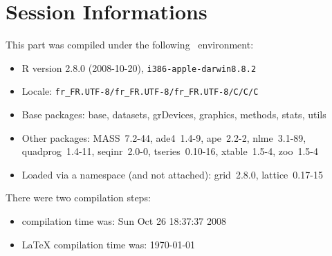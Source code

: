 \documentclass{article}
\begin{document}
\section*{Session Informations}

This part was compiled under the following \Rlogo{}~environment:

\begin{itemize}
  \item R version 2.8.0 (2008-10-20), \verb|i386-apple-darwin8.8.2|
  \item Locale: \verb|fr_FR.UTF-8/fr_FR.UTF-8/fr_FR.UTF-8/C/C/C|
  \item Base packages: base, datasets, grDevices, graphics, methods,
    stats, utils
  \item Other packages: MASS~7.2-44, ade4~1.4-9, ape~2.2-2,
    nlme~3.1-89, quadprog~1.4-11, seqinr~2.0-0, tseries~0.10-16,
    xtable~1.5-4, zoo~1.5-4
  \item Loaded via a namespace (and not attached): grid~2.8.0,
    lattice~0.17-15
\end{itemize}
There were two compilation steps:

\begin{itemize}
  \item \Rlogo{} compilation time was: Sun Oct 26 18:37:37 2008
  \item \LaTeX{} compilation time was: \today
\end{itemize}

%
%
\clearpage
{}


\end{document}
